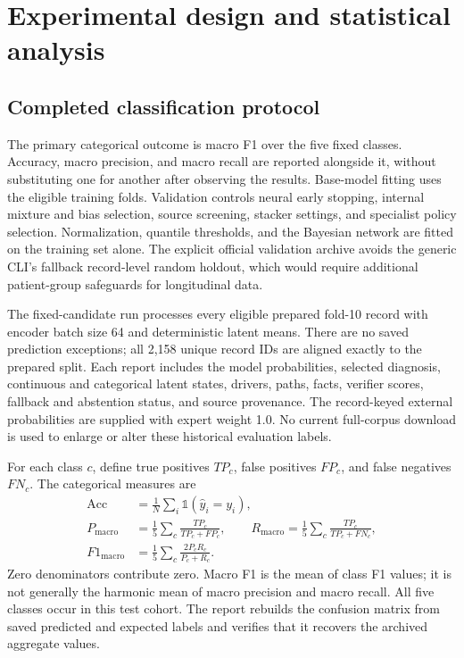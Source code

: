 \section{Experimental design and statistical analysis}
\label{sec:experiments}
\subsection{Completed classification protocol}
The primary categorical outcome is macro F1 over the five fixed classes. Accuracy, macro precision, and macro recall are reported alongside it, without substituting one for another after observing the results. Base-model fitting uses the eligible training folds. Validation controls neural early stopping, internal mixture and bias selection, source screening, stacker settings, and specialist policy selection. Normalization, quantile thresholds, and the Bayesian network are fitted on the training set alone. The explicit official validation archive avoids the generic CLI's fallback record-level random holdout, which would require additional patient-group safeguards for longitudinal data.

The fixed-candidate run processes every eligible prepared fold-10 record with encoder batch size 64 and deterministic latent means. There are no saved prediction exceptions; all 2,158 unique record IDs are aligned exactly to the prepared split. Each report includes the model probabilities, selected diagnosis, continuous and categorical latent states, drivers, paths, facts, verifier scores, fallback and abstention status, and source provenance. The record-keyed external probabilities are supplied with expert weight 1.0. No current full-corpus download is used to enlarge or alter these historical evaluation labels.

For each class $c$, define true positives $TP_c$, false positives $FP_c$, and false negatives $FN_c$. The categorical measures are
\begin{align}
\mathrm{Acc}&=\frac{1}{N}\sum_i\mathbb{1}(\hat y_i=y_i),\\
P_{\mathrm{macro}}&=\frac{1}{5}\sum_c\frac{TP_c}{TP_c+FP_c},\qquad
R_{\mathrm{macro}}=\frac{1}{5}\sum_c\frac{TP_c}{TP_c+FN_c},\\
F1_{\mathrm{macro}}&=\frac{1}{5}\sum_c\frac{2P_cR_c}{P_c+R_c}.
\end{align}
Zero denominators contribute zero. Macro F1 is the mean of class F1 values; it is not generally the harmonic mean of macro precision and macro recall. All five classes occur in this test cohort. The report rebuilds the confusion matrix from saved predicted and expected labels and verifies that it recovers the archived aggregate values.

